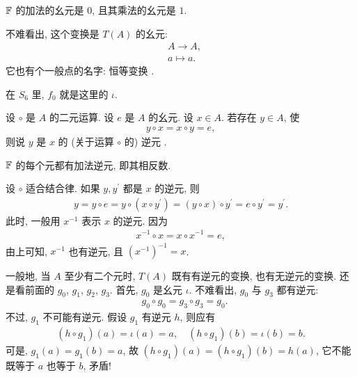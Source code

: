 \begin{example}
    $\mathbb{F}$ 的加法的幺元是 $0$, 且其乘法的幺元是 $1$.
\end{example}

\begin{example}
    不难看出, 这个变换是 $T(A)$ 的幺元:
    \begin{align*}
         & A \to A,  \tag*{$\iota$:} \\
         & a \mapsto a.
    \end{align*}
    它也有个一般点的名字: 恒等变换 .

    在 $S_6$ 里, $f_0$ 就是这里的 $\iota$.
\end{example}

\begin{definition}
    设 $\circ$ 是 $A$ 的二元运算. 设 $e$ 是 $A$ 的幺元. 设 $x \in A$. 若存在 $y \in A$, 使
    \begin{align*}
        y \circ x = x \circ y = e,
    \end{align*}
    则说 $y$ 是 $x$ 的 (关于运算 $\circ$ 的) 逆元 .
\end{definition}

\begin{example}
    $\mathbb{F}$ 的每个元都有加法逆元, 即其相反数.
\end{example}

\begin{remark}
    设 $\circ$ 适合结合律. 如果 $y, y^{\prime}$ 都是 $x$ 的逆元, 则
    \begin{align*}
        y = y \circ e = y \circ (x \circ y^{\prime}) = (y \circ x) \circ y^{\prime} = e \circ y^{\prime} = y^{\prime}.
    \end{align*}
    此时, 一般用 $x^{-1}$ 表示 $x$ 的逆元. 因为
    \begin{align*}
        x^{-1} \circ x = x \circ x^{-1} = e,
    \end{align*}
    由上可知, $x^{-1}$ 也有逆元, 且 $(x^{-1})^{-1} = x$.
\end{remark}

\begin{example}
    一般地, 当 $A$ 至少有二个元时, $T(A)$ 既有有逆元的变换, 也有无逆元的变换. 还是看前面的 $g_0$, $g_1$, $g_2$, $g_3$. 首先, $g_0$ 是幺元 $\iota$. 不难看出, $g_0$ 与 $g_3$ 都有逆元:
    \begin{align*}
         & g_0 \circ g_0 = g_3 \circ g_3 = g_0.
    \end{align*}
    不过, $g_1$ 不可能有逆元. 假设 $g_1$ 有逆元 $h$, 则应有
    \begin{align*}
        (h \circ g_1)(a) = \iota(a) = a, \quad (h \circ g_1)(b) = \iota(b) = b.
    \end{align*}
    可是, $g_1(a) = g_1(b) = a$, 故 $(h \circ g_1)(a) = (h \circ g_1)(b) = h(a)$, 它不能既等于 $a$ 也等于 $b$, 矛盾!
\end{example}


